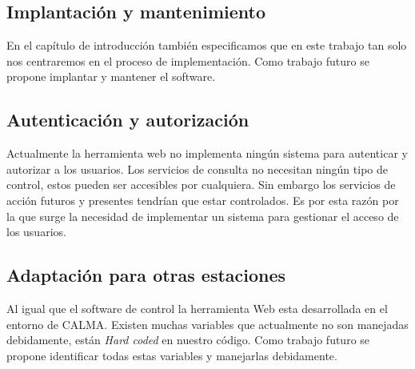 	\subsection{Implantación y mantenimiento}
	En el capítulo de introducción también especificamos que en este trabajo tan solo nos centraremos en el proceso de implementación. Como
	trabajo futuro se propone implantar y mantener el software.
	\subsection{Autenticación y autorización}
	Actualmente la herramienta web no implementa ningún sistema para autenticar y autorizar a los usuarios. Los servicios de consulta no necesitan
	ningún tipo de control, estos pueden ser accesibles por cualquiera. Sin embargo los servicios de acción futuros y presentes tendrían que estar
	controlados. Es por esta razón por la que surge la necesidad de implementar un sistema para gestionar el acceso de los usuarios. 
	\subsection{Adaptación para otras estaciones}
	Al igual que el software de control la herramienta Web esta desarrollada en el entorno de CALMA. Existen muchas variables que actualmente no
	son manejadas debidamente, están \emph{Hard coded} en nuestro código. Como trabajo futuro se propone identificar todas estas variables y
	manejarlas debidamente.


